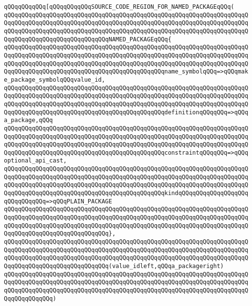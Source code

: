 \verb|qQQqqQQqqQQq[qQQqqQQqqQQqSOURCE_CODE_REGION_FOR_NAMED_PACKAGEqQQq(|\newline
\verb|qQQqqQQqqQQqqQQqqQQqqQQqqQQqqQQqqQQqqQQqqQQqqQQqqQQqqQQqqQQqqQQqqQQqqQQqqQQqqQQqqQQqqQQqqQQqqQQqqQQqqQQqqQQqqQQqqQQqqQQqqQQqqQQqqQQqqQQqqQQqqQQqqQQqqQQqqQQqqQQqqQQqqQQqqQQqqQQqqQQqqQQqqQQqqQQqqQQqqQQqqQQqqQQqqQQqqQQqqQQqqQQqqQQqqQQqqQQqqQQqNAMED_PACKAGEqQQq{|\newline
\verb|qQQqqQQqqQQqqQQqqQQqqQQqqQQqqQQqqQQqqQQqqQQqqQQqqQQqqQQqqQQqqQQqqQQqqQQqqQQqqQQqqQQqqQQqqQQqqQQqqQQqqQQqqQQqqQQqqQQqqQQqqQQqqQQqqQQqqQQqqQQqqQQqqQQqqQQqqQQqqQQqqQQqqQQqqQQqqQQqqQQqqQQqqQQqqQQqqQQqqQQqqQQqqQQqqQQqqQQqqQQqqQQqqQQqqQQqqQQqqQQqqQQqqQQqqQQqqQQqname_symbolqQQq=>qQQqmake_package_symbolqQQqvalue_id,|\newline
\verb|qQQqqQQqqQQqqQQqqQQqqQQqqQQqqQQqqQQqqQQqqQQqqQQqqQQqqQQqqQQqqQQqqQQqqQQqqQQqqQQqqQQqqQQqqQQqqQQqqQQqqQQqqQQqqQQqqQQqqQQqqQQqqQQqqQQqqQQqqQQqqQQqqQQqqQQqqQQqqQQqqQQqqQQqqQQqqQQqqQQqqQQqqQQqqQQqqQQqqQQqqQQqqQQqqQQqqQQqqQQqqQQqqQQqqQQqqQQqqQQqqQQqqQQqqQQqqQQqdefinitionqQQqqQQq=>qQQqa_package,qQQq|\newline
\verb|qQQqqQQqqQQqqQQqqQQqqQQqqQQqqQQqqQQqqQQqqQQqqQQqqQQqqQQqqQQqqQQqqQQqqQQqqQQqqQQqqQQqqQQqqQQqqQQqqQQqqQQqqQQqqQQqqQQqqQQqqQQqqQQqqQQqqQQqqQQqqQQqqQQqqQQqqQQqqQQqqQQqqQQqqQQqqQQqqQQqqQQqqQQqqQQqqQQqqQQqqQQqqQQqqQQqqQQqqQQqqQQqqQQqqQQqqQQqqQQqqQQqqQQqqQQqqQQqconstraintqQQqqQQq=>qQQqoptional_api_cast,|\newline
\verb|qQQqqQQqqQQqqQQqqQQqqQQqqQQqqQQqqQQqqQQqqQQqqQQqqQQqqQQqqQQqqQQqqQQqqQQqqQQqqQQqqQQqqQQqqQQqqQQqqQQqqQQqqQQqqQQqqQQqqQQqqQQqqQQqqQQqqQQqqQQqqQQqqQQqqQQqqQQqqQQqqQQqqQQqqQQqqQQqqQQqqQQqqQQqqQQqqQQqqQQqqQQqqQQqqQQqqQQqqQQqqQQqqQQqqQQqqQQqqQQqqQQqqQQqqQQqqQQqkindqQQqqQQqqQQqqQQqqQQqqQQqqQQqqQQq=>qQQqPLAIN_PACKAGE|\newline
\verb|qQQqqQQqqQQqqQQqqQQqqQQqqQQqqQQqqQQqqQQqqQQqqQQqqQQqqQQqqQQqqQQqqQQqqQQqqQQqqQQqqQQqqQQqqQQqqQQqqQQqqQQqqQQqqQQqqQQqqQQqqQQqqQQqqQQqqQQqqQQqqQQqqQQqqQQqqQQqqQQqqQQqqQQqqQQqqQQqqQQqqQQqqQQqqQQqqQQqqQQqqQQqqQQqqQQqqQQqqQQqqQQqqQQqqQQqqQQqqQQq},|\newline
\verb|qQQqqQQqqQQqqQQqqQQqqQQqqQQqqQQqqQQqqQQqqQQqqQQqqQQqqQQqqQQqqQQqqQQqqQQqqQQqqQQqqQQqqQQqqQQqqQQqqQQqqQQqqQQqqQQqqQQqqQQqqQQqqQQqqQQqqQQqqQQqqQQqqQQqqQQqqQQqqQQqqQQqqQQqqQQqqQQqqQQqqQQqqQQqqQQqqQQqqQQqqQQqqQQqqQQqqQQqqQQqqQQqqQQqqQQqqQQqqQQq(value_idleft,qQQqa_packageright)|\newline
\verb|qQQqqQQqqQQqqQQqqQQqqQQqqQQqqQQqqQQqqQQqqQQqqQQqqQQqqQQqqQQqqQQqqQQqqQQqqQQqqQQqqQQqqQQqqQQqqQQqqQQqqQQqqQQqqQQqqQQqqQQqqQQqqQQqqQQqqQQqqQQqqQQqqQQqqQQqqQQqqQQqqQQqqQQqqQQqqQQqqQQqqQQqqQQqqQQqqQQqqQQqqQQqqQQqqQQqqQQqqQQqqQQq)|\newline
